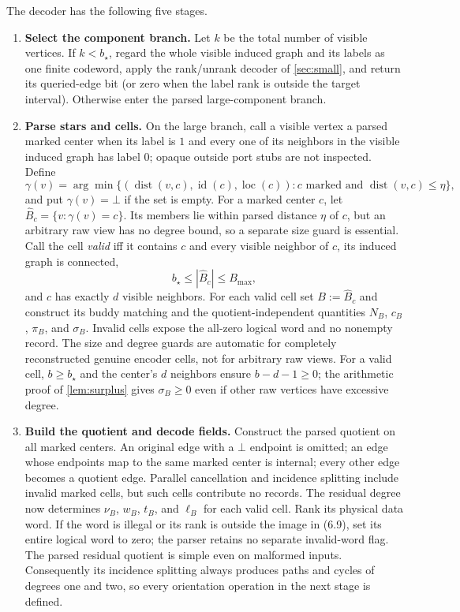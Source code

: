 \documentclass[11pt]{article}
\theoremstyle{definition}
\theoremstyle{remark}
\newcommand{\id}{\operatorname{id}}
\newcommand{\dist}{\operatorname{dist}}
\begin{document}
The decoder has the following five stages.
\begin{enumerate}[label=\textbf{\arabic*.},leftmargin=2.3em]
\item \textbf{Select the component branch.}
      Let $k$ be the total number of visible vertices.  If $k<b_\star$,
      regard the whole visible induced graph and its labels as one finite
      codeword, apply the rank/unrank decoder of \cref{sec:small}, and return
      its queried-edge bit (or zero when the label rank is outside the target
      interval).  Otherwise enter the parsed large-component branch.

\item \textbf{Parse stars and cells.}
      On the large branch, call a visible vertex a parsed marked center when
      its label is $1$ and every one of its neighbors in the visible induced
      graph has label $0$; opaque outside port stubs are not inspected.  Define
      \[
       \gamma(v)=\arg\min\{(\dist(v,c),\id(c),\operatorname{loc}(c)):
          c\text{ marked and }\dist(v,c)\le\eta\},             \tag{9.1}
      \]
      and put $\gamma(v)=\bot$ if the set is empty.  For a marked center $c$,
      let $\widehat B_c=\{v:\gamma(v)=c\}$.  Its members lie within parsed
      distance $\eta$ of $c$, but an arbitrary raw view has no degree bound,
      so a separate size guard is essential.  Call the cell \emph{valid} iff
      it contains $c$ and every visible neighbor of $c$, its induced graph is
      connected,
      \[
                  b_\star\le |\widehat B_c|\le B_{\max},
      \]
      and $c$ has exactly $d$ visible neighbors.  For each valid cell set
      $B:=\widehat B_c$ and construct its buddy matching and the
      quotient-independent quantities $N_B$, $c_B$, $\pi_B$, and $\sigma_B$.
      Invalid cells expose the all-zero logical word and no nonempty record.
      The size and degree guards are automatic for completely reconstructed
      genuine encoder cells, not for arbitrary raw views.
      For a valid cell, $b\ge b_\star$ and the center's $d$ neighbors ensure
      $b-d-1\ge0$; the arithmetic proof of \cref{lem:surplus} gives
      $\sigma_B\ge0$ even if other raw vertices have excessive degree.

\item \textbf{Build the quotient and decode fields.}
      Construct the parsed quotient on all marked centers.  An original edge
      with a $\bot$ endpoint is omitted; an edge whose endpoints map to the
      same marked center is internal; every other edge becomes a quotient
      edge.  Parallel cancellation and incidence splitting include
      invalid marked cells, but such cells contribute no records.  The
      residual degree now determines $\nu_B$, $w_B$, $t_B$, and $\ell_B$ for each
      valid cell.  Rank its physical data word.  If the word is illegal or
      its rank is outside the image in (6.9), set its entire logical word to
      zero; the parser retains no separate invalid-word flag.
      The parsed residual quotient is simple even on malformed inputs.
      Consequently its incidence splitting always produces paths and cycles
      of degrees one and two, so every orientation operation in the next
      stage is defined.


\end{enumerate}
\end{document}
